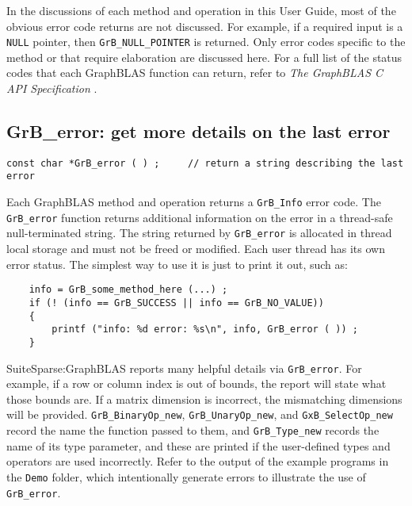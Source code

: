 \documentclass[12pt]{article}
\begin{document}
In the discussions of each method and operation in this User Guide, most of the
obvious error code returns are not discussed.  For example, if a required input
is a \verb'NULL' pointer, then \verb'GrB_NULL_POINTER' is returned.  Only error
codes specific to the method or that require elaboration are discussed here.
For a full list of the status codes that each GraphBLAS function can return,
refer to {\em The GraphBLAS C API Specification} \cite{spec}.

\newpage
\subsection{{\sf GrB\_error:} get more details on the last error} %
\label{error}

\begin{mdframed}[userdefinedwidth=6in]
{\footnotesize
\begin{verbatim}
const char *GrB_error ( ) ;     // return a string describing the last error
\end{verbatim}
}\end{mdframed}

Each GraphBLAS method and operation returns a \verb'GrB_Info' error code.  The
\verb'GrB_error' function returns additional information on the error in a
thread-safe null-terminated string.  The string returned by \verb'GrB_error' is
allocated in thread local storage and must not be freed or modified.
Each user thread has its own error status.
The simplest way to use it is just to print it out, such as:

    {\footnotesize
    \begin{verbatim}
    info = GrB_some_method_here (...) ;
    if (! (info == GrB_SUCCESS || info == GrB_NO_VALUE))
    {
        printf ("info: %d error: %s\n", info, GrB_error ( )) ;
    } \end{verbatim}}

SuiteSparse:GraphBLAS reports many helpful details via \verb'GrB_error'.  For
example, if a row or column index is out of bounds, the report will state what
those bounds are.  If a matrix dimension is incorrect, the mismatching
dimensions will be provided.  \verb'GrB_BinaryOp_new', \verb'GrB_UnaryOp_new',
and \verb'GxB_SelectOp_new' record the name the function passed to them, and
\verb'GrB_Type_new' records the name of its type parameter, and these are
printed if the user-defined types and operators are used incorrectly.  Refer to
the output of the example programs in the \verb'Demo' folder, which
intentionally generate errors to illustrate the use of \verb'GrB_error'.
\end{document}
